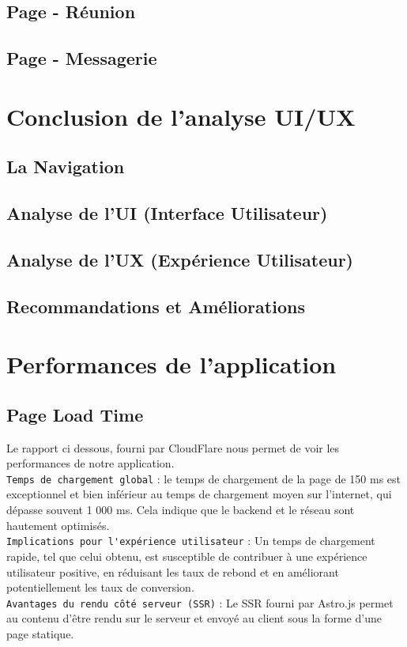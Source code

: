 \documentclass[12pt, a4paper, oneside]{thesis}
\begin{document}
\subsection{Page - Réunion}

\subsection{Page - Messagerie}

\section{Conclusion de l'analyse UI/UX}

\subsection{La Navigation}
\subsection{Analyse de l'UI (Interface Utilisateur)}
\subsection{Analyse de l'UX (Expérience Utilisateur)}
\subsection{Recommandations et Améliorations}
\newpage

\section{Performances de l'application}

\subsection{Page Load Time}

Le rapport ci dessous, fourni par CloudFlare nous permet de voir les performances de notre application.\\

\verb|Temps de chargement global| : le temps de chargement de la page de 150 ms est exceptionnel et bien inférieur au temps de chargement moyen sur l'internet, qui dépasse souvent 1 000 ms. Cela indique que le backend et le réseau sont hautement optimisés.\\

\verb|Implications pour l'expérience utilisateur| : Un temps de chargement rapide, tel que celui obtenu, est susceptible de contribuer à une expérience utilisateur positive, en réduisant les taux de rebond et en améliorant potentiellement les taux de conversion.\\
\verb|Avantages du rendu côté serveur (SSR)| : Le SSR fourni par Astro.js permet au contenu d'être rendu sur le serveur et envoyé au client sous la forme d'une page statique.\\

\end{document}
